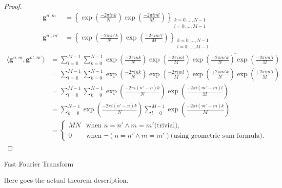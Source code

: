 \begin{proof}
    \begin{align*} 
        \boldsymbol{g}^{n,m}    &= \left\{\exp\left({\frac{-2\pi ink}{N}}\right)\exp\left({\frac{-2\pi iml}{M}}\right)\right\}_{\substack{k=0,\ldots,N-1\\l=0,\ldots,M-1}}\\
        \boldsymbol{g}^{n',m'}  &= \left\{\exp\left({\frac{-2\pi in'k}{N}}\right)\exp\left({\frac{-2\pi im'l}{M}}\right)\right\}_{\substack{k=0,\ldots,N-1\\l=0,\ldots,M-1}}
    \end{align*}
    \begin{equation*}
        \begin{split}  
            \langle\boldsymbol{g}^{n,m},\boldsymbol{g}^{n',m'}\rangle &= \sum_{l=0}^{M-1}\sum_{k=0}^{N-1} \exp\left({\frac{-2\pi ink}{N}}\right)\exp\left({\frac{-2\pi iml}{M}}\right)\overline{\exp\left({\frac{-2\pi in'k}{N}}\right)\exp\left({\frac{-2\pi im'l}{M}}\right)}\\
            &= \sum_{l=0}^{M-1}\sum_{k=0}^{N-1} \exp\left({\frac{-2\pi ink}{N}}\right)\exp\left({\frac{-2\pi iml}{M}}\right)\exp\left({\frac{+2\pi in'k}{N}}\right)\exp\left({\frac{+2\pi im'l}{M}}\right)\\
            &= \sum_{l=0}^{M-1}\sum_{k=0}^{N-1} \exp\left({\frac{-2\pi i(n'-n)k}{N}}\right)\exp\left({\frac{-2\pi i(m'-m)l}{M}}\right)\\
            &= \sum_{k=0}^{N-1} \exp\left({\frac{-2\pi i(n'-n)k}{N}}\right)\sum_{l=0}^{M-1} \exp\left({\frac{-2\pi i(m'-m)k}{M}}\right)\\
            &= 
            \begin{cases}
                MN & \text{when $n = n' \wedge m=m'$}\text{(trivial)},\\
                0 & \text{when $\neg(n = n' \wedge m=m')$}\text{(using geometric sum formula)}.
            \end{cases}    
        \end{split}
    \end{equation*}
    

    
\end{proof}



Fast Fourier Transform \cite{fft_cooley_tukey} \cite{fft_good_pfa} \cite{wavelets_linear_algebra_frazier} \cite{algorithm_clrs}




\begin{Thm}\label{theorem:dft is unitary}
    
    Here goes the actual theorem description.
\end{Thm}








